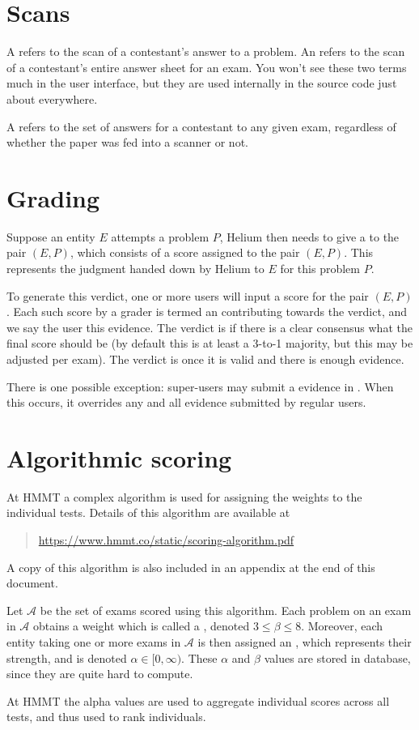 \section{Scans}
A  refers to the scan
of a contestant's answer to a problem.
An  refers to the scan
of a contestant's entire answer sheet for an exam.
You won't see these two terms much in the user interface,
but they are used internally in the source code just about everywhere.

A  refers to the set of answers for
a contestant to any given exam,
regardless of whether the paper was fed into a scanner or not.

\section{Grading}
Suppose an entity $E$ attempts a problem $P$,
Helium then needs to give a  to the pair $(E,P)$,
which consists of a score assigned to the pair $(E,P)$.
This represents the judgment handed down by Helium to $E$
for this problem $P$.

To generate this verdict,
one or more users will input a score for the pair $(E,P)$.
Each such score by a grader is termed an 
contributing towards the verdict,
and we say the user  this evidence.
The verdict is  if there is a clear consensus what the final
score should be (by default this is at least a 3-to-1 majority,
but this may be adjusted per exam).
The verdict is  once it is valid and there is enough evidence.

There is one possible exception:
super-users may submit a evidence in .
When this occurs, it overrides any and all evidence submitted by regular users.

\section{Algorithmic scoring}
At HMMT a complex algorithm is used for assigning
the weights to the individual tests.
Details of this algorithm are available at
\begin{quote}
	\url{https://www.hmmt.co/static/scoring-algorithm.pdf}
\end{quote}
A copy of this algorithm is also included in an appendix
at the end of this document.

Let $\mathcal A$ be the set of exams scored using this algorithm.
Each problem on an exam in $\mathcal A$
obtains a weight which is called a ,
denoted $3 \le \beta \le 8$.
Moreover, each entity taking one or more exams in $\mathcal A$
is then assigned an ,
which represents their strength, and is denoted $\alpha \in [0,\infty)$.
These $\alpha$ and $\beta$ values are stored in database,
since they are quite hard to compute.

At HMMT the alpha values are used to aggregate individual scores
across all tests, and thus used to rank individuals.


